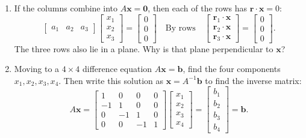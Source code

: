 \documentclass[14pt, a4paper]{article}
\begin{document}
\begin{enumerate}
    \item If the columns combine into $A\boldsymbol{x} = \boldsymbol{0}$, then each of the rows has $\boldsymbol{r} \cdot \boldsymbol{x} = 0$:
          \[
              \begin{bmatrix}
                  a_1 & a_2 & a_3
              \end{bmatrix}
              \begin{bmatrix}
                  x_1 \\ x_2 \\ x_3
              \end{bmatrix}
              =
              \begin{bmatrix}
                  0 \\ 0 \\ 0
              \end{bmatrix}
              \quad \text{By rows} \quad
              \begin{bmatrix}
                  \boldsymbol{r}_1 \cdot \boldsymbol{x} \\
                  \boldsymbol{r}_2 \cdot \boldsymbol{x} \\
                  \boldsymbol{r}_3 \cdot \boldsymbol{x}
              \end{bmatrix}
              =
              \begin{bmatrix}
                  0 \\ 0 \\ 0
              \end{bmatrix}.
          \]
          The three rows also lie in a plane. Why is that plane perpendicular to $\boldsymbol{x}$?

    \item Moving to a $4 \times 4$ difference equation $A\boldsymbol{x} = \boldsymbol{b}$, find the four components $x_1, x_2, x_3, x_4$. Then write this solution as $\boldsymbol{x} = A^{-1}\boldsymbol{b}$ to find the inverse matrix:
          \[
              A\boldsymbol{x} =
              \begin{bmatrix}
                  1  & 0  & 0  & 0 \\
                  -1 & 1  & 0  & 0 \\
                  0  & -1 & 1  & 0 \\
                  0  & 0  & -1 & 1
              \end{bmatrix}
              \begin{bmatrix}
                  x_1 \\ x_2 \\ x_3 \\ x_4
              \end{bmatrix}
              =
              \begin{bmatrix}
                  b_1 \\ b_2 \\ b_3 \\ b_4
              \end{bmatrix}
              = \boldsymbol{b}.
          \]


\end{enumerate}
\end{document}
